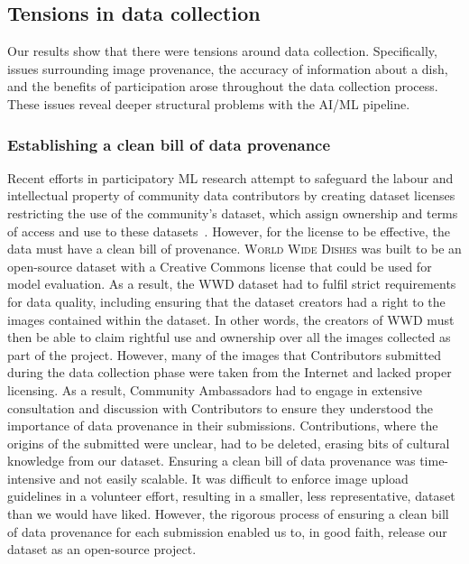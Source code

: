 \subsection{Tensions in data collection}
 
Our results show that there were tensions around data collection. Specifically, issues surrounding image provenance, the accuracy of information about a dish, and the benefits of participation arose throughout the data collection process. These issues reveal deeper structural problems with the AI/ML pipeline. 
\subsubsection{Establishing a clean bill of data provenance}
Recent efforts in participatory ML research attempt to safeguard the labour and intellectual property of community data contributors by creating dataset licenses restricting the use of the community's dataset, which assign ownership and terms of access and use to these datasets~\cite{birhanePowerPeopleOpportunities2022,longpre2024largelicence}. However, for the license to be effective, the data must have a clean bill of provenance. \textsc{World Wide Dishes} was built to be an open-source dataset with a Creative Commons license that could be used for model evaluation. As a result, the WWD dataset had to fulfil strict requirements for data quality, including ensuring that the dataset creators had a right to the images contained within the dataset.  In other words, the creators of \textsc{WWD} must then be able to claim rightful use and ownership over all the images collected as part of the project. However, many of the images that Contributors submitted during the data collection phase were taken from the Internet and lacked proper licensing. As a result, Community Ambassadors had to engage in extensive consultation and discussion with Contributors to ensure they understood the importance of data provenance in their submissions. Contributions, where the origins of the submitted were unclear, had to be deleted, erasing bits of cultural knowledge from our dataset. Ensuring a clean bill of data provenance was time-intensive and not easily scalable. It was difficult to enforce image upload guidelines in a volunteer effort, resulting in a smaller, less representative, dataset than we would have liked. However, the rigorous process of ensuring a clean bill of data provenance for each submission enabled us to, in good faith, release our dataset as an open-source project. 

